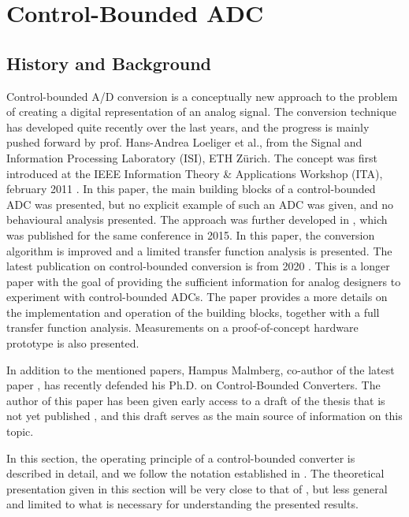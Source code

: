
\chapter{Control-Bounded ADC}
\label{sec:cbadc}
\section{History and Background}
Control-bounded A/D conversion is a conceptually new approach to the problem of creating a digital representation of an analog signal. The conversion technique has developed quite recently over the last years, and the progress is mainly pushed forward by prof. Hans-Andrea Loeliger et al., from the Signal and Information Processing Laboratory (ISI), ETH Zürich. The concept was first introduced at the IEEE Information Theory \& Applications Workshop (ITA), february 2011 \cite{cbc_2011_loeliger}. In this paper, the main building blocks of a control-bounded ADC was presented, but no explicit example of such an ADC was given, and no behavioural analysis presented. The approach was further developed in \cite{cbc_2015_loeliger}, which was published for the same conference in 2015. In this paper, the conversion algorithm is improved and a limited transfer function analysis is presented. The latest publication on control-bounded conversion is from 2020 \cite{cbc_2020_loeliger}. This is a longer paper with the goal of providing the sufficient information for analog designers to experiment with control-bounded ADCs. The paper provides a more details on the implementation and operation of the building blocks, together with a full transfer function analysis. Measurements on a proof-of-concept hardware prototype is also presented.

In addition to the mentioned papers, Hampus Malmberg, co-author of the latest paper \cite{cbc_2020_loeliger}, has recently defended his Ph.D. on Control-Bounded Converters. The author of this paper has been given early access to a draft of the thesis that is not yet published \cite{malmberg_thesis}, and this draft serves as the main source of information on this topic.

In this section, the operating principle of a control-bounded converter is described in detail, and we follow the notation established in \cite{cbc_2020_loeliger}. The theoretical presentation given in this section will be very close to that of \cite{malmberg_thesis}, but less general and limited to what is necessary for understanding the presented results.


























